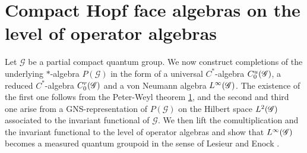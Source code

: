 \section{Compact Hopf face algebras on the level of operator algebras}


Let $\mathscr{G}$ be a partial compact quantum group. We now construct
completions of the underlying $*$-algebra $P(\mathscr{G})$ in the form
of a universal $C^{*}$-algebra $C^{u}_{0}(\mathscr{G})$, a reduced $C^{*}$-algebra
$C^{r}_{0}(\mathscr{G})$ and a von Neumann algebra $L^{\infty}(\mathscr{G})$. The existence of the first
one follows from the Peter-Weyl theorem \ref{}, and the second and
third one arise from a GNS-representation of $P(\mathscr{G})$ on the
Hilbert space $L^{2}(\mathscr{G})$ associated to the invariant functional of
$\mathscr{G}$.  We then lift the comultiplication and the invariant
functional to the level of operator algebras and show that $L^{\infty}(\mathscr{G})$
becomes a measured quantum groupoid in the sense of Lesieur \cite{}
and Enock \cite{}.

